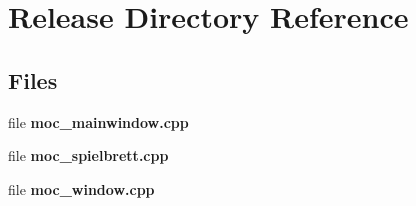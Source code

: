 \section{Release Directory Reference}
\label{dir_92709420fde8ca446636ff7c23065e8b}
\subsection*{Files}
\begin{DoxyCompactItemize}
\item 
file {\bfseries moc\-\_\-mainwindow.\-cpp}
\item 
file {\bfseries moc\-\_\-spielbrett.\-cpp}
\item 
file {\bfseries moc\-\_\-window.\-cpp}
\end{DoxyCompactItemize}
